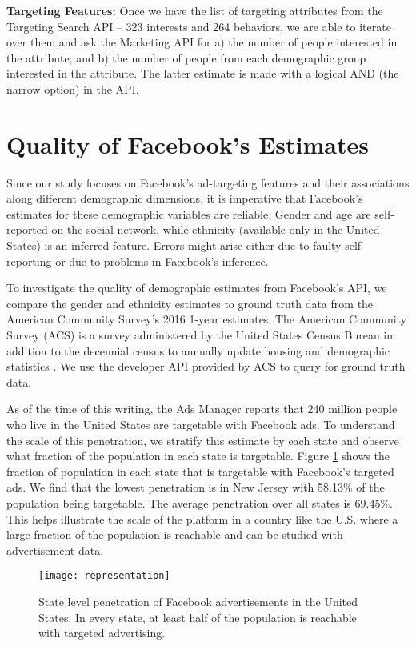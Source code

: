 \textbf{Targeting Features:} Once we have the list of targeting attributes from the Targeting Search API -- 323 interests and 264 behaviors, we are able to iterate over them and ask the Marketing API for a) the number of people interested in the attribute; and b) the number of people from each demographic group interested in the attribute. The latter estimate is made with a logical AND (the narrow option) in the API.

\section{Quality of Facebook's Estimates} \label{sec:fb_quality}
Since our study focuses on Facebook's ad-targeting features and their associations along different demographic dimensions, it is imperative that Facebook's estimates for these demographic variables are reliable. Gender and age are self-reported on the social network, while ethnicity (available only in the United States) is an inferred feature. Errors might arise either due to faulty self-reporting or due to problems in Facebook's inference.

To investigate the quality of demographic estimates from Facebook's API, we compare the gender and ethnicity estimates to ground truth data from the American Community Survey's 2016 1-year estimates. The American Community Survey (ACS) is a survey administered by the United States Census Bureau in addition to the decennial census to annually update housing and demographic statistics \cite{acs2017info}. We use the developer API provided by ACS to query for ground truth data.

As of the time of this writing, the Ads Manager reports that 240 million people who live in the United States are targetable with Facebook ads. To understand the scale of this penetration, we stratify this estimate by each state and observe what fraction of the population in each state is targetable. Figure \ref{fig:rep_map} shows the fraction of population in each state that is targetable with Facebook's targeted ads. We find that the lowest penetration is in New Jersey with 58.13\% of the population being targetable. The average penetration over all states is 69.45\%. This helps illustrate the scale of the platform in a country like the U.S. where a large fraction of the population is reachable and can be studied with advertisement data.

\begin{figure}
\centering
\texttt{[image: representation]}
\caption{State level penetration of Facebook advertisements in the United States. In every state, at least half of the population is reachable with targeted advertising.}
\label{fig:rep_map}
\end{figure}

